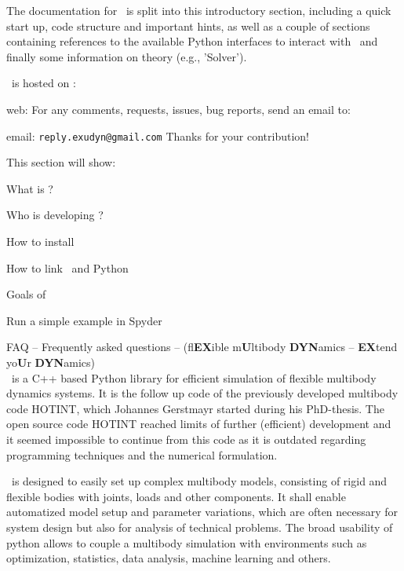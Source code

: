 
The documentation for \codeName\ is split into this introductory section, including a quick start up, code structure and important hints, 
as well as a couple of sections containing references to the available Python interfaces to interact with \codeName\ and finally some information on theory (e.g., 'Solver').

\codeName\ is hosted on  \cite{EXUDYNgit}:
\bi
 \item web: 
\ei
For any comments, requests, issues, bug reports, send an email to: 
\bi
  \item email: \texttt{reply.exudyn@gmail.com}
\ei
Thanks for your contribution!

This section will show:
\bn
	\item What is \codeName ?
	\item Who is developing \codeName ?
	\item How to install \codeName\ 
	\item How to link \codeName\ and Python
	\item Goals of \codeName
	\item Run a simple example in Spyder
	\item FAQ -- Frequently asked questions
\en
%
\codeName -- {\small (fl{\bf EX}ible m{\bf U}ltibody {\bf DYN}amics  -- {\bf EX}tend yo{\bf U}r {\bf DYN}amics)}\vspace{6pt}\\
\noindent \codeName\ is a C++ based Python library for efficient simulation of flexible multibody dynamics systems.
It is the follow up code of the previously developed multibody code HOTINT, which Johannes Gerstmayr started during his PhD-thesis.
The open source code HOTINT reached limits of further (efficient) development and it seemed impossible to continue from this code as it is outdated regarding programming techniques and the numerical formulation.

\codeName\ is designed to easily set up complex multibody models, consisting of rigid and flexible bodies with joints, loads and other components. It shall enable automatized model setup and parameter variations, which are often necessary for system design but also for analysis of technical problems. The broad usability of python allows to couple a multibody simulation with environments such as optimization, statistics, data analysis, machine learning and others.

